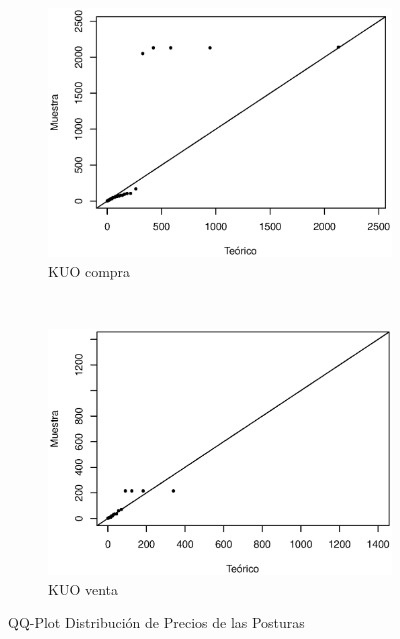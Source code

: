 \documentclass[11pt]{article}
\numberwithin{equation}{section} %
\begin{document}
\begin{figure}[htbp]
\begin{subfigure}[b]{0.5\textwidth}
\centering
\includegraphics[width=\textwidth, trim=0 0.5cm 0 1cm]{kuocompraqq.eps}
\caption{KUO compra}
\label{fig:kuocompraqq}
\end{subfigure}%
~ %
\begin{subfigure}[b]{0.5\textwidth}
\centering
\includegraphics[width=\textwidth, trim=0 0.5cm 0 1cm]{kuoventaqq.eps}
\caption{KUO venta}
\label{fig:kuoventaqq}
\end{subfigure}

\caption{QQ-Plot Distribución de Precios de las Posturas}
\label{fig:preciosqq}
\end{figure}
\end{document}
